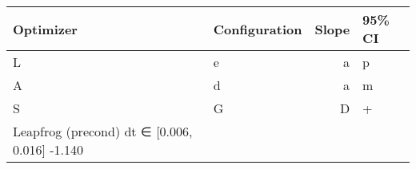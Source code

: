 ﻿\begin{tabular}{l l r l}\toprule
Optimizer & Configuration & Slope & 95\% CI\\\midrule
L & e & a & p\\
A & d & a & m\\
S & G & D & +\\
Leapfrog (precond) dt ∈ [0.006, 0.016] -1.140 &  &  & \\
\bottomrule\end{tabular}
